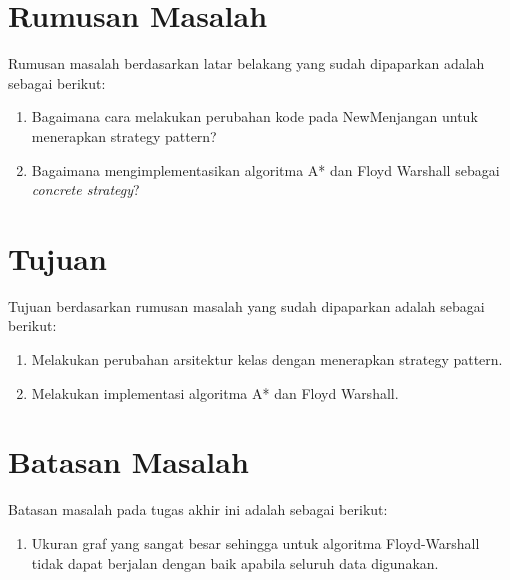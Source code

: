 \section{Rumusan Masalah}
\label{sec:rumusan}
Rumusan masalah berdasarkan latar belakang yang sudah dipaparkan adalah sebagai berikut:
\begin{enumerate}
    \item Bagaimana cara melakukan perubahan kode pada NewMenjangan untuk menerapkan strategy pattern?
    \item Bagaimana mengimplementasikan algoritma A* dan Floyd Warshall sebagai \textit{concrete strategy}?
\end{enumerate}

\section{Tujuan}
\label{sec:tujuan}
Tujuan berdasarkan rumusan masalah yang sudah dipaparkan adalah sebagai berikut:
\begin{enumerate}
    \item Melakukan perubahan arsitektur kelas dengan menerapkan strategy pattern.
    \item Melakukan implementasi algoritma A* dan Floyd Warshall.
\end{enumerate}

\section{Batasan Masalah}
\label{sec:batasan}
Batasan masalah pada tugas akhir ini adalah sebagai berikut:
\begin{enumerate}
    \item Ukuran graf yang sangat besar sehingga untuk algoritma Floyd-Warshall tidak dapat berjalan dengan baik apabila seluruh data digunakan.
\end{enumerate}

